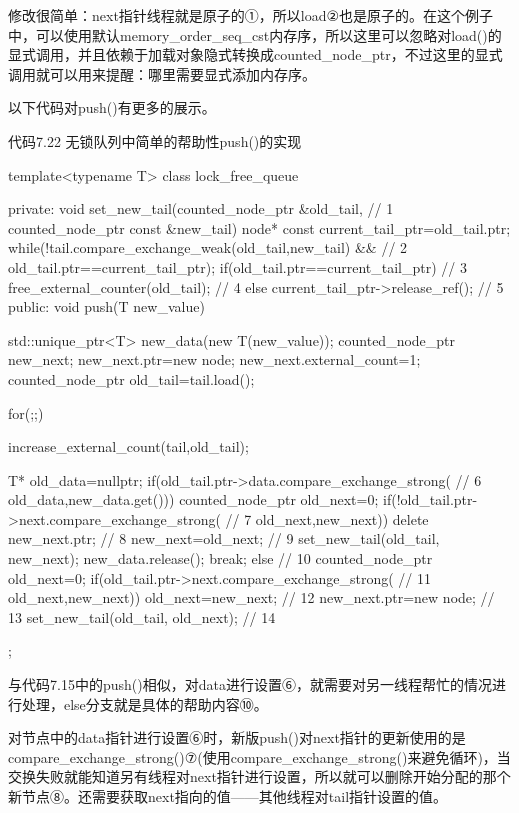修改很简单：next指针线程就是原子的①，所以load②也是原子的。在这个例子中，可以使用默认memory\_order\_seq\_cst内存序，所以这里可以忽略对load()的显式调用，并且依赖于加载对象隐式转换成counted\_node\_ptr，不过这里的显式调用就可以用来提醒：哪里需要显式添加内存序。

以下代码对push()有更多的展示。

代码7.22 无锁队列中简单的帮助性push()的实现

\begin{cpp}
template<typename T>
class lock_free_queue
{
private:
  void set_new_tail(counted_node_ptr &old_tail,  // 1
                    counted_node_ptr const &new_tail)
  {
    node* const current_tail_ptr=old_tail.ptr;
    while(!tail.compare_exchange_weak(old_tail,new_tail) &&  // 2
          old_tail.ptr==current_tail_ptr);
    if(old_tail.ptr==current_tail_ptr)  // 3
      free_external_counter(old_tail);  // 4
    else
      current_tail_ptr->release_ref();  // 5
  }
public:
  void push(T new_value)
  {
    std::unique_ptr<T> new_data(new T(new_value));
    counted_node_ptr new_next;
    new_next.ptr=new node;
    new_next.external_count=1;
    counted_node_ptr old_tail=tail.load();

    for(;;)
    {
      increase_external_count(tail,old_tail);

      T* old_data=nullptr;
      if(old_tail.ptr->data.compare_exchange_strong(  // 6
         old_data,new_data.get()))
      {
        counted_node_ptr old_next={0};
        if(!old_tail.ptr->next.compare_exchange_strong(  // 7
           old_next,new_next))
        {
          delete new_next.ptr;  // 8
          new_next=old_next;  // 9
        }
        set_new_tail(old_tail, new_next);
        new_data.release();
        break;
      }
      else  // 10
      {
        counted_node_ptr old_next={0};
        if(old_tail.ptr->next.compare_exchange_strong(  // 11
           old_next,new_next))
        {
          old_next=new_next;  // 12
          new_next.ptr=new node;  // 13
        }
        set_new_tail(old_tail, old_next);  // 14
      }
    }
  }
};
\end{cpp}

与代码7.15中的push()相似，对data进行设置⑥，就需要对另一线程帮忙的情况进行处理，else分支就是具体的帮助内容⑩。

对节点中的data指针进行设置⑥时，新版push()对next指针的更新使用的是compare\_exchange\_strong()⑦(使用compare\_exchange\_strong()来避免循环)，当交换失败就能知道另有线程对next指针进行设置，所以就可以删除开始分配的那个新节点⑧。还需要获取next指向的值——其他线程对tail指针设置的值。

